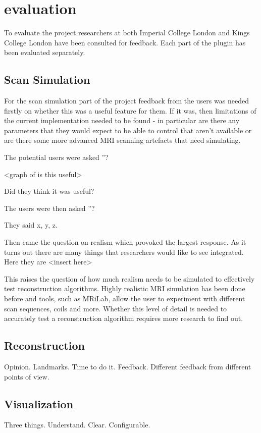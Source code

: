 \chapter{evaluation}\label{chapter:evaluation}

To evaluate the project researchers at both Imperial College London and Kings College London have been consulted for feedback. Each part of the plugin has been evaluated separately.

\section{Scan Simulation}
For the scan simulation part of the project feedback from the users was needed firstly on whether this was a useful feature for them. If it was, then limitations of the current implementation needed to be found - in particular are there any parameters that they would expect to be able to control that aren't available or are there some more advanced MRI scanning artefacts that need simulating.

The potential users were asked ''?

<graph of is this useful>

Did they think it was useful?

The users were then asked ''?

They said x, y, z.

Then came the question on realism which provoked the largest response. As it turns out there are many things that researchers would like to see integrated. Here they are <insert here>

This raises the question of how much realism needs to be simulated to effectively test reconstruction algorithms. Highly realistic MRI simulation has been done before and tools, such as MRiLab\cite{mrilab}, allow the user to experiment with different scan sequences, coils and more. Whether this level of detail is needed to accurately test a reconstruction algorithm requires more research to find out.

\section{Reconstruction}
Opinion. Landmarks. Time to do it. Feedback. Different feedback from different points of view.

\section{Visualization}
Three things. Understand. Clear. Configurable.

